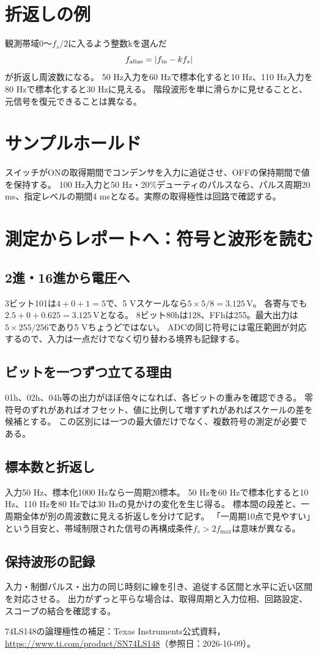 \documentclass[lualatex,a4paper,10pt]{jlreq}
\begin{document}
\section{折返しの例}\label{sec:auto6}
観測帯域$0$〜$f_s/2$に入るよう整数kを選んだ
\[
 f_{\rm alias}=|f_{\rm in}-kf_s|
\]
が折返し周波数になる。
50 Hz入力を60 Hzで標本化すると10 Hz、110 Hz入力を80 Hzで標本化すると30 Hzに見える。
階段波形を単に滑らかに見せることと、元信号を復元できることは異なる。
\section{サンプルホールド}\label{sec:auto7}
スイッチがONの取得期間でコンデンサを入力に追従させ、OFFの保持期間で値を保持する。
100 Hz入力と50 Hz・20\%デューティのパルスなら、パルス周期20 ms、指定レベルの期間4 msとなる。実際の取得極性は回路で確認する。
\section{測定からレポートへ：符号と波形を読む}\label{sec:auto8}
\subsection{2進・16進から電圧へ}
3ビット101は$4+0+1=5$で、5 Vスケールなら$5\times5/8=3.125\,\mathrm{V}$。
各寄与でも$2.5+0+0.625=3.125\,\mathrm{V}$となる。
8ビット80hは128、FFhは255。最大出力は$5\times255/256$であり5 Vちょうどではない。
ADCの同じ符号には電圧範囲が対応するので、入力は一点だけでなく切り替わる境界も記録する。
\subsection{ビットを一つずつ立てる理由}
01h、02h、04h等の出力がほぼ倍々になれば、各ビットの重みを確認できる。
零符号のずれがあればオフセット、値に比例して増すずれがあればスケールの差を候補とする。
この区別には一つの最大値だけでなく、複数符号の測定が必要である。
\subsection{標本数と折返し}
入力50 Hz、標本化1000 Hzなら一周期20標本。
50 Hzを60 Hzで標本化すると10 Hz、110 Hzを80 Hzでは30 Hzの見かけの変化を生じ得る。
標本間の段差と、一周期全体が別の周波数に見える折返しを分けて記す。
「一周期10点で見やすい」という目安と、帯域制限された信号の再構成条件$f_s>2f_{\max}$は意味が異なる。
\subsection{保持波形の記録}
入力・制御パルス・出力の同じ時刻に線を引き、追従する区間と水平に近い区間を対応させる。
出力がずっと平らな場合は、取得周期と入力位相、回路設定、スコープの結合を確認する。
\par\smallskip
74LS148の論理極性の補足：Texas Instruments公式資料，
\url{https://www.ti.com/product/SN74LS148}（参照日：2026-10-09）。
\end{document}
